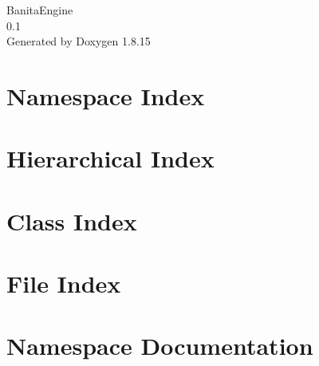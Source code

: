 \let\mypdfximage\pdfximage\def\pdfximage{\immediate\mypdfximage}\documentclass[twoside]{book}
\newcommand{\+}{\discretionary{\mbox{\scriptsize$\hookleftarrow$}}{}{}}
\newcommand{\clearemptydoublepage}{%
  \newpage{\pagestyle{empty}\cleardoublepage}%
}
\begin{document}
\hypersetup{pageanchor=false,
             bookmarksnumbered=true,
             pdfencoding=unicode
            }
\begin{titlepage}
\vspace*{7cm}
\begin{center}%
{\Large Banita\+Engine \\[1ex]\large 0.\+1 }\\
\vspace*{1cm}
{\large Generated by Doxygen 1.8.15}\\
\end{center}
\end{titlepage}
\clearemptydoublepage
{}
\tableofcontents
\clearemptydoublepage
{}
\hypersetup{pageanchor=true}

\chapter{Namespace Index}

\chapter{Hierarchical Index}

\chapter{Class Index}

\chapter{File Index}

\chapter{Namespace Documentation}

\end{document}
